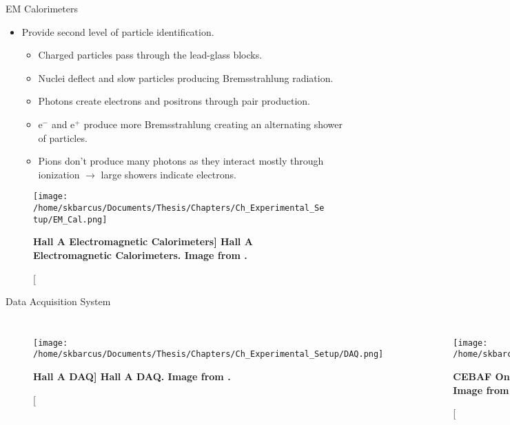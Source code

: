 \documentclass[10pt]{beamer}
\begin{document}
\begin{frame}[fragile]{EM Calorimeters}

	\begin{itemize}
		\item Provide second level of \alert{particle identification}.
			\begin{itemize}
				\item[--] Charged particles pass through the lead-glass blocks.
				\item[--] Nuclei deflect and slow particles producing \alert{Bremsstrahlung radiation}.
				\item[--] Photons create electrons and positrons through \alert{pair production}. 
				\item[--] e$^-$ and e$^+$ produce more Bremsstrahlung creating an \alert{alternating shower of particles}.
				\item[--] Pions don't produce many photons as they interact mostly through ionization $\rightarrow$ large showers indicate electrons.
			\end{itemize}
	\end{itemize}
	
	\begin{figure}[!ht]
	\begin{center}
	\texttt{[image: /home/skbarcus/Documents/Thesis/Chapters/Ch\_Experimental\_Setup/EM\_Cal.png]}
	\end{center}
	\caption[\bf{Hall A Electromagnetic Calorimeters}]{
	{\bf{Hall A Electromagnetic Calorimeters.}} Image from \cite{Article:HallA}.}
	\label{fig:halla_top}
	\end{figure}	
	
\end{frame}

\begin{frame}[fragile]{Data Acquisition System}

	\begin{columns}[T,onlytextwidth]  
	\begin{figure}[!ht]
	\begin{center}
	\texttt{[image: /home/skbarcus/Documents/Thesis/Chapters/Ch\_Experimental\_Setup/DAQ.png]}
	\end{center}
	\caption[\bf{Hall A DAQ}]{
	{\bf{Hall A DAQ.}} Image from \cite{DAQ}.}
	\label{fig:halla_top}
	\end{figure}	
	
	\begin{figure}[!ht]
	\begin{center}
	\texttt{[image: /home/skbarcus/Documents/Thesis/Chapters/Ch\_Experimental\_Setup/CODA.png]}
	\end{center}
	\caption[\bf{CEBAF Online Data Acquisition}]{
	{\bf{CEBAF Online Data Acquisition.}} Image from \cite{DAQ}.}
	\label{fig:halla_top}
	\end{figure}	
	\end{columns}
	
\end{frame}
\end{document}
